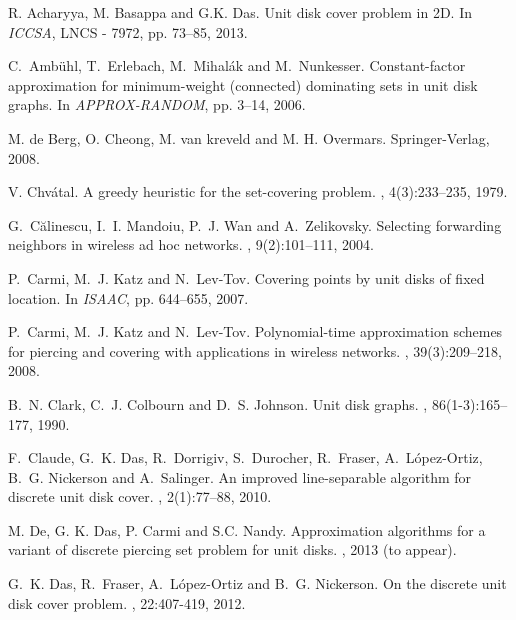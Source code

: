 \documentclass[a4paper,11pt]{article}
\begin{document}

\begin{thebibliography}{10}
R. Acharyya, M. Basappa and G.K. Das.
\newblock Unit disk cover problem in 2D.
\newblock In {\em ICCSA}, LNCS - 7972, pp. 73--85, 2013. 

C.~Amb{\"u}hl, T.~Erlebach, M.~Mihal{\'a}k and M.~Nunkesser.
\newblock Constant-factor approximation for minimum-weight (connected)
  dominating sets in unit disk graphs.
\newblock In {\em APPROX-RANDOM}, pp. 3--14, 2006.

M. de Berg, O. Cheong, M. van kreveld and M. H. Overmars.
\newblock Springer-Verlag, 2008.

V. Chv\'{a}tal.
\newblock A greedy heuristic for the set-covering problem. 
, 4(3):233--235, 1979.

G.~C{\u{a}}linescu, I.~I. Mandoiu, P.~J. Wan and A.~Zelikovsky.
\newblock Selecting forwarding neighbors in wireless ad hoc networks.
, 9(2):101--111, 2004.

P.~Carmi, M.~J. Katz and N.~Lev-Tov.
\newblock Covering points by unit disks of fixed location.
\newblock In {\em ISAAC}, pp. 644--655, 2007.

P.~Carmi, M.~J. Katz and N.~Lev-Tov.
\newblock Polynomial-time approximation schemes for piercing and covering with
  applications in wireless networks.
, 39(3):209--218, 2008.

B.~N. Clark, C.~J. Colbourn and D.~S. Johnson.
\newblock Unit disk graphs.
, 86(1-3):165--177, 1990.

F.~Claude, G.~K. Das, R.~Dorrigiv, S.~Durocher, R.~Fraser, A.~L{\'o}pez-Ortiz,
  B.~G. Nickerson and A.~Salinger.
\newblock An improved line-separable algorithm for discrete unit disk cover.
, 2(1):77--88, 2010.

M. De, G. K. Das, P. Carmi and S.C. Nandy.
\newblock Approximation algorithms for a variant 
of discrete piercing set problem for unit disks.
, 2013 (to appear).

G.~K. Das, R.~Fraser, A.~L{\'o}pez-Ortiz and B.~G. Nickerson.
\newblock On the discrete unit disk cover problem.
, 22:407-419, 2012.


\end{thebibliography}
\end{document}
